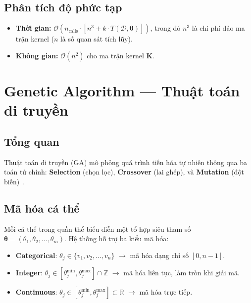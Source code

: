 \documentclass[12pt,a4paper]{article}
\begin{document}
\subsection{Phân tích độ phức tạp}

\begin{itemize}
    \item \textbf{Thời gian:}
    $\mathcal{O}\!\left(n_{\text{calls}} \cdot
    \left[n^3 + k \cdot T(\mathcal{D}, \boldsymbol{\theta})\right]\right)$,
    trong đó $n^3$ là chi phí đảo ma trận kernel ($n$ là số quan sát tích lũy).

    \item \textbf{Không gian:}
    $\mathcal{O}(n^2)$ cho ma trận kernel $\mathbf{K}$.
\end{itemize}

\newpage
\section{Genetic Algorithm --- Thuật toán di truyền}
\label{sec:genetic}

\subsection{Tổng quan}

Thuật toán di truyền (GA) mô phỏng quá trình tiến hóa tự nhiên thông qua ba
toán tử chính: \textbf{Selection} (chọn lọc), \textbf{Crossover} (lai ghép),
và \textbf{Mutation} (đột biến)~\cite{holland1975adaptation}.

\subsection{Mã hóa cá thể}

Mỗi cá thể trong quần thể biểu diễn một tổ hợp siêu tham số
$\boldsymbol{\theta} = (\theta_1, \theta_2, \ldots, \theta_m)$. Hệ thống hỗ trợ
ba kiểu mã hóa:

\begin{itemize}
    \item \textbf{Categorical}: $\theta_j \in \{v_1, v_2, \ldots, v_n\}$
    $\rightarrow$ mã hóa dạng chỉ số $[0, n-1]$.

    \item \textbf{Integer}: $\theta_j \in [\theta_j^{\min}, \theta_j^{\max}] \cap \mathbb{Z}$
    $\rightarrow$ mã hóa liên tục, làm tròn khi giải mã.

    \item \textbf{Continuous}: $\theta_j \in [\theta_j^{\min}, \theta_j^{\max}] \subset \mathbb{R}$
    $\rightarrow$ mã hóa trực tiếp.
\end{itemize}
\end{document}
